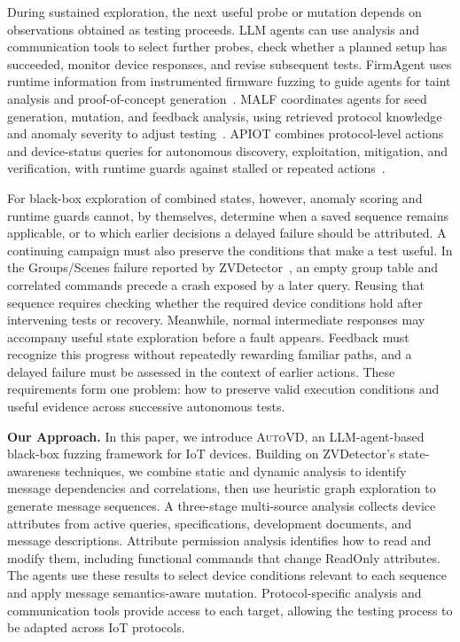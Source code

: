 \documentclass[10pt,journal,compsoc]{IEEEtran}
\newcommand{\system}{\textsc{AutoVD}}
\begin{document}
During sustained exploration, the next useful probe or mutation depends on observations obtained as testing proceeds. LLM agents can use analysis and communication tools to select further probes, check whether a planned setup has succeeded, monitor device responses, and revise subsequent tests. FirmAgent uses runtime information from instrumented firmware fuzzing to guide agents for taint analysis and proof-of-concept generation~\cite{firmagent}. MALF coordinates agents for seed generation, mutation, and feedback analysis, using retrieved protocol knowledge and anomaly severity to adjust testing~\cite{malf}. APIOT combines protocol-level actions and device-status queries for autonomous discovery, exploitation, mitigation, and verification, with runtime guards against stalled or repeated actions~\cite{apiot}.
 
For black-box exploration of combined states, however, anomaly scoring and runtime guards cannot, by themselves, determine when a saved sequence remains applicable, or to which earlier decisions a delayed failure should be attributed. A continuing campaign must also preserve the conditions that make a test useful. In the Groups/Scenes failure reported by ZVDetector~\cite{zvdetector}, an empty group table and correlated commands precede a crash exposed by a later query. Reusing that sequence requires checking whether the required device conditions hold after intervening tests or recovery. Meanwhile, normal intermediate responses may accompany useful state exploration before a fault appears. Feedback must recognize this progress without repeatedly rewarding familiar paths, and a delayed failure must be assessed in the context of earlier actions. These requirements form one problem: how to preserve valid execution conditions and useful evidence across successive autonomous tests.

\textbf{Our Approach.} In this paper, we introduce \system{}, an LLM-agent-based black-box fuzzing framework for IoT devices. Building on ZVDetector's state-awareness techniques, we combine static and dynamic analysis to identify message dependencies and correlations, then use heuristic graph exploration to generate message sequences. A three-stage multi-source analysis collects device attributes from active queries, specifications, development documents, and message descriptions. Attribute permission analysis identifies how to read and modify them, including functional commands that change ReadOnly attributes. The agents use these results to select device conditions relevant to each sequence and apply message semantics-aware mutation. Protocol-specific analysis and communication tools provide access to each target, allowing the testing process to be adapted across IoT protocols.
\end{document}
